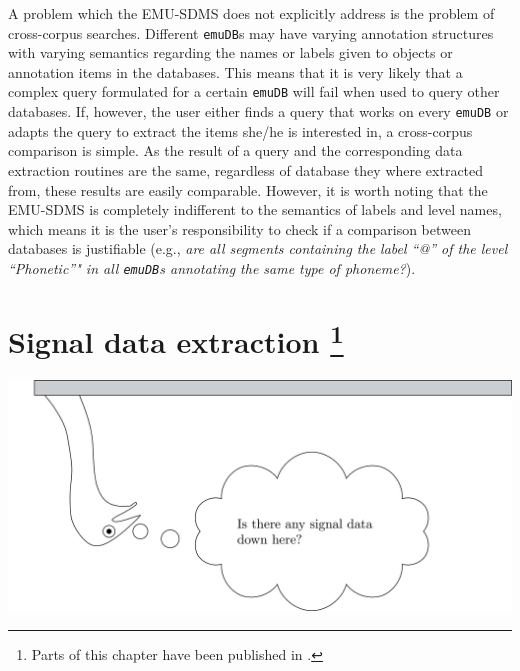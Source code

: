 \documentclass[]{book}
\let\rmarkdownfootnote\footnote%
\def\footnote{\protect\rmarkdownfootnote}
\begin{document}
A problem which the EMU-SDMS does not explicitly address is the problem of cross-corpus searches. Different \texttt{emuDB}s may have varying annotation structures with varying semantics regarding the names or labels given to objects or annotation items in the databases. This means that it is very likely that a complex query formulated for a certain \texttt{emuDB} will fail when used to query other databases. If, however, the user either finds a query that works on every \texttt{emuDB} or adapts the query to extract the items she/he is interested in, a cross-corpus comparison is simple. As the result of a query and the corresponding data extraction routines are the same, regardless of database they where extracted from, these results are easily comparable. However, it is worth noting that the EMU-SDMS is completely indifferent to the semantics of labels and level names, which means it is the user's responsibility to check if a comparison between databases is justifiable (e.g., \emph{are all segments containing the label ``@'' of the level ``Phonetic''" in all \texttt{emuDB}s annotating the same type of phoneme?}).

\hypertarget{chap:sigDataExtr}{%
\chapter[Signal data extraction ]{\texorpdfstring{Signal data extraction \footnote{Parts of this chapter have been published in \citet{winkelmann:2017aa}.}}{Signal data extraction }}\label{chap:sigDataExtr}}

\begin{center}\includegraphics[width=0.65\linewidth]{pics/EMU-webAppEmu_sigDataExtr} \end{center}
\end{document}
